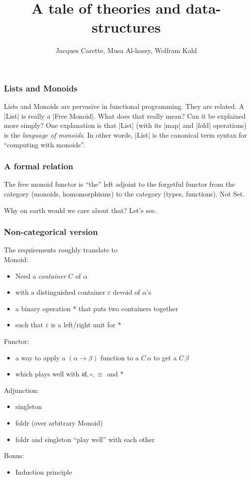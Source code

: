 \documentclass[serif,mathserif,professionalfont,10pt]{beamer}
\title{A tale of theories and data-structures}
\author[Carette, Al-hassy, Kahl]{Jacques Carette, Musa Al-hassy, Wolfram Kahl}
\institute[McMaster]{McMaster University, Hamilton}
\begin{document}
\frame{\titlepage}

\begin{frame}
\frametitle{Lists and Monoids}
Lists and Monoids are pervasive in functional programming.
They are related. A |List| is really a |Free Monoid|. What does that really mean?
Can it be explained more simply? One explanation is that |List| (with its |map| and
|fold| operations) is the \emph{language of monoids}. In other words, |List| is the
canonical term syntax for ``computing with monoids''.
\end{frame}

\begin{frame}
\frametitle{A formal relation}
The free monoid functor is ``the'' left adjoint to the forgetful functor from
the category (monoids, homomorphisms) to the category (types, functions). Not Set.

%
%

Why on earth would we care about that? Let's see.

\end{frame}

\begin{frame}
\frametitle{Non-categorical version}
The requirements roughly translate to\\
Monoid:
\begin{itemize}
\item Need a \emph{container} $C$ of $α$
\item with a distinguished container $ε$ devoid of $α$'s
\item a binary operation $*$ that puts two containers together
\item such that $ε$ is a left/right unit for $*$
\end{itemize}
Functor:
\begin{itemize}
\item a way to apply a $(α → β)$ function to a $C\, α$ to get a $C \, β$
\item which plays well with $\mathsf{id}, ∘, ≡$ and $*$
\end{itemize}
Adjunction:
\begin{itemize}
\item singleton
\item foldr (over arbitrary Monoid)
\item foldr and singleton ``play well'' with each other
\end{itemize}
Bonus:
\begin{itemize}
\item Induction principle
\end{itemize}
\end{frame}
%
%
\end{document}
